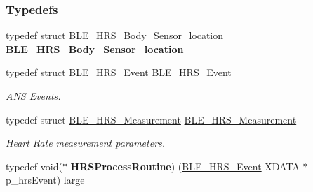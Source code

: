 \subsubsection*{Typedefs}
\begin{DoxyCompactItemize}
\item 
typedef struct \hyperlink{struct_b_l_e___h_r_s___body___sensor__location}{B\+L\+E\+\_\+\+H\+R\+S\+\_\+\+Body\+\_\+\+Sensor\+\_\+location} {\bfseries B\+L\+E\+\_\+\+H\+R\+S\+\_\+\+Body\+\_\+\+Sensor\+\_\+location}\hypertarget{group___b_l_e___h_r_s_ga95c930c30bd6d13a7c9a023b8b9a7485}{}\label{group___b_l_e___h_r_s_ga95c930c30bd6d13a7c9a023b8b9a7485}

\item 
typedef struct \hyperlink{struct_b_l_e___h_r_s___event}{B\+L\+E\+\_\+\+H\+R\+S\+\_\+\+Event} \hyperlink{group___b_l_e___h_r_s_ga661a055c3730d8577db524bbf513fe26}{B\+L\+E\+\_\+\+H\+R\+S\+\_\+\+Event}\hypertarget{group___b_l_e___h_r_s_ga661a055c3730d8577db524bbf513fe26}{}\label{group___b_l_e___h_r_s_ga661a055c3730d8577db524bbf513fe26}

\begin{DoxyCompactList}\small\item\em A\+NS Events. \end{DoxyCompactList}\item 
typedef struct \hyperlink{struct_b_l_e___h_r_s___measurement}{B\+L\+E\+\_\+\+H\+R\+S\+\_\+\+Measurement} \hyperlink{group___b_l_e___h_r_s_gab589edfdbd07d9f6e3f8e78f75c44ad9}{B\+L\+E\+\_\+\+H\+R\+S\+\_\+\+Measurement}\hypertarget{group___b_l_e___h_r_s_gab589edfdbd07d9f6e3f8e78f75c44ad9}{}\label{group___b_l_e___h_r_s_gab589edfdbd07d9f6e3f8e78f75c44ad9}

\begin{DoxyCompactList}\small\item\em Heart Rate measurement parameters. \end{DoxyCompactList}\item 
typedef void($\ast$ {\bfseries H\+R\+S\+Process\+Routine}) (\hyperlink{struct_b_l_e___h_r_s___event}{B\+L\+E\+\_\+\+H\+R\+S\+\_\+\+Event} X\+D\+A\+TA $\ast$p\+\_\+hrs\+Event) large\hypertarget{group___b_l_e___h_r_s_gaf2c27a825c82e2505c3e4016ed354460}{}\label{group___b_l_e___h_r_s_gaf2c27a825c82e2505c3e4016ed354460}

\end{DoxyCompactItemize}
